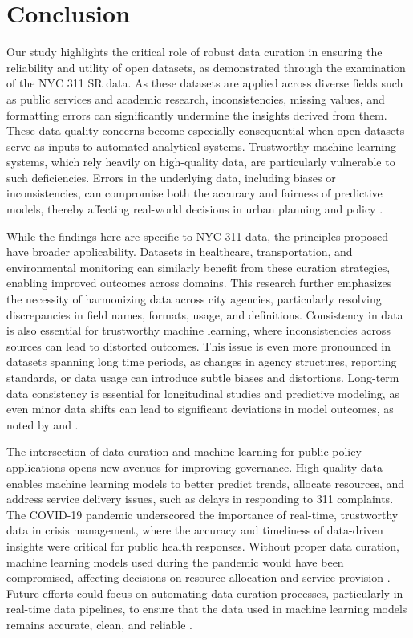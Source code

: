 \documentclass[linenumber]{jdsart}
\begin{document}
\section{Conclusion} 
\label{sec:conclusion}
Our study highlights the critical role of robust data curation in
ensuring the reliability and utility of open datasets, as demonstrated
through the examination of the NYC 311 SR data. As these datasets are
applied across diverse fields such as public services and academic
research, inconsistencies, missing values, and formatting errors can
significantly undermine the insights derived from them. 
These data quality concerns become especially consequential when open
datasets serve as inputs to automated analytical systems.
Trustworthy machine learning systems, which rely heavily on high-quality data,
are particularly vulnerable to such deficiencies. Errors in the underlying data,
including biases or inconsistencies, can compromise both the accuracy
and fairness of predictive models, thereby affecting real-world
decisions in urban planning and policy \citep{rahm2000data, geiger2020garbage}.


While the findings here are specific to NYC 311 data, the principles 
proposed have broader applicability. Datasets in healthcare, 
transportation, and environmental monitoring can similarly benefit 
from these curation strategies, enabling improved outcomes across 
domains. This research further emphasizes the 
necessity of harmonizing data across city agencies, 
particularly resolving discrepancies in field
names, formats, usage, and definitions. Consistency in data is also 
essential for trustworthy machine learning, where 
inconsistencies across sources can
lead to distorted outcomes. This issue is even more pronounced in 
datasets spanning long time periods, as changes in agency 
structures, reporting standards, or data usage can introduce 
subtle biases and distortions. Long-term data 
consistency is essential for longitudinal studies and 
predictive modeling, as even minor 
data shifts can lead to significant deviations in model outcomes, 
as noted by \citet{rahm2000data} and \citet{borgman2012conundrum}.

The intersection of data curation and machine learning for
public policy applications opens new avenues for improving governance.
High-quality data enables machine learning models to better predict
trends, allocate resources, and address service delivery issues, such
as delays in responding to 311 complaints. The COVID-19 pandemic
underscored the importance of real-time, trustworthy data in crisis
management, where the accuracy and timeliness of data-driven insights
were critical for public health responses. Without proper data
curation, machine learning models used during the pandemic would have
been compromised, affecting decisions on resource allocation and
service provision \citep{worby2020face, khemasuwan2021applications}.
Future efforts could focus on automating data curation processes,
particularly in real-time data pipelines, to ensure that the data used
in machine learning models remains accurate, clean, and reliable
\citep{chu2016data, hurbean2021open}.
\end{document}
